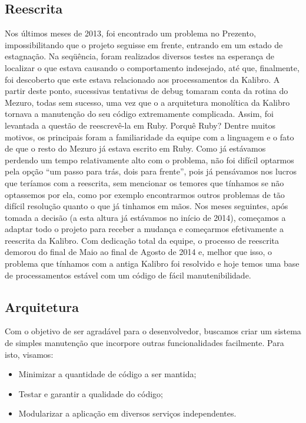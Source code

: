 \documentclass{llncs}
\begin{document}
\subsection{Reescrita}
Nos últimos meses de 2013, foi encontrado um problema no Prezento, impossibilitando que o projeto seguisse em frente, entrando em um estado de estagnação. Na seqüência, foram realizados diversos testes na esperança de localizar o que estava causando o comportamento indesejado, até que, finalmente, foi descoberto que este estava relacionado aos processamentos da Kalibro. A partir deste ponto, sucessivas tentativas de debug tomaram conta da rotina do Mezuro, todas sem sucesso, uma vez que o a arquitetura monolítica da Kalibro tornava a manutenção do seu código extremamente complicada. Assim, foi levantada a questão de reescrevê-la em Ruby. Porquê Ruby? Dentre muitos motivos, os principais foram a familiaridade da equipe com a linguagem e o fato de que o resto do Mezuro já estava escrito em Ruby. 
Como já estávamos perdendo um tempo relativamente alto com o problema, não foi difícil optarmos pela opção ``um passo para trás, dois para frente'', pois já pensávamos nos lucros que teríamos com a reescrita, sem mencionar os temores que tínhamos se não optassemos por ela, como por exemplo encontrarmos outros problemas de tão difícil resolução quanto o que já tinhamos em mãos. Nos meses seguintes, após tomada a decisão (a esta altura já estávamos no início de 2014), começamos a adaptar todo o projeto para receber a mudança e começarmos efetivamente a reescrita da Kalibro. 
Com dedicação total da equipe, o processo de reescrita demorou do final de Maio ao final de Agosto de 2014 e, melhor que isso, o problema que tínhamos com a antiga Kalibro foi resolvido e hoje temos uma base de processamentos estável com um código de fácil manutenibilidade.

  \subsection{Arquitetura}
  Com o objetivo de ser agradável para o desenvolvedor, buscamos criar um sistema de simples manutenção que incorpore outras funcionalidades facilmente. Para isto, visamos:
  \begin{itemize}
    \item Minimizar a quantidade de código a ser mantida;
    \item Testar e garantir a qualidade do código;
    \item Modularizar a aplicação em diversos serviços independentes.
  \end{itemize}
\end{document}
